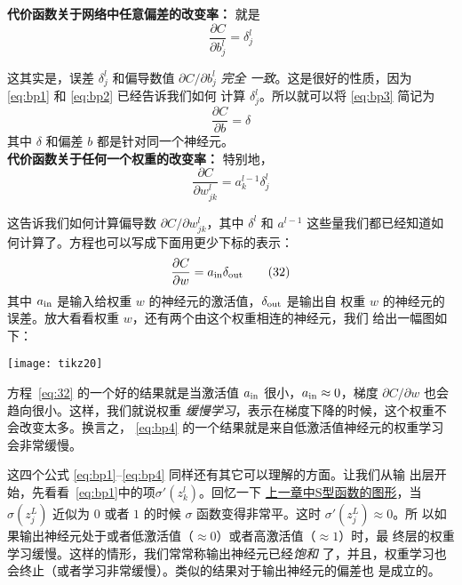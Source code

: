 \textbf{代价函数关于网络中任意偏差的改变率：} 就是
\begin{equation}
  \frac{\partial C}{\partial b^l_j} = \delta^l_j
  \label{eq:bp3}\tag{BP3}
\end{equation}

这其实是，误差 $\delta^l_j$ 和偏导数值 $\partial C / \partial b^l_j$ \emph{完全
  一致}。这是很好的性质，因为 \eqref{eq:bp1} 和 \eqref{eq:bp2} 已经告诉我们如何
计算 $\delta^l_j$。所以就可以将 \eqref{eq:bp3} 简记为
\begin{equation}
  \frac{\partial C}{\partial b} = \delta
  \label{eq:31}\tag{31}
\end{equation}
其中 $\delta$ 和偏差 $b$ 都是针对同一个神经元。\\

\textbf{代价函数关于任何一个权重的改变率：} 特别地，
\begin{equation}
  \frac{\partial C}{\partial w^l_{jk}} = a^{l-1}_k \delta^l_j
  \label{eq:bp4}\tag{BP4}
\end{equation}

这告诉我们如何计算偏导数 $\partial C/\partial w_{jk}^l$，其中 $\delta^l$ 和
$a^{l-1}$ 这些量我们都已经知道如何计算了。方程也可以写成下面用更少下标的表示：
\begin{equation}
  \frac{\partial
    C}{\partial w} = a_{\rm in} \delta_{\rm out}
  \label{eq:32}\tag{32}
\end{equation}
其中 $a_{\rm in}$ 是输入给权重 $w$ 的神经元的激活值，$\delta_{\rm out}$ 是输出自
权重 $w$ 的神经元的误差。放大看看权重 $w$，还有两个由这个权重相连的神经元，我们
给出一幅图如下：

\begin{center}
  \texttt{[image: tikz20]}
\end{center}

方程~\eqref{eq:32} 的一个好的结果就是当激活值 $a_{\rm in}$ 很小，$a_{\rm in}
\approx 0$，梯度 $\partial C/\partial w$ 也会趋向很小。这样，我们就说权重%
\emph{缓慢学习}，表示在梯度下降的时候，这个权重不会改变太多。换言之，
\eqref{eq:bp4} 的一个结果就是来自低激活值神经元的权重学习会非常缓慢。

这四个公式 \eqref{eq:bp1}--\eqref{eq:bp4} 同样还有其它可以理解的方面。让我们从输
出层开始，先看看~\eqref{eq:bp1}中的项$\sigma'(z_k^l)$。回忆一下%
\hyperref[fig:StepFunction]{上一章中S型函数的图形}，当 $\sigma(z^L_j)$ 近似为
$0$ 或者 $1$ 的时候 $\sigma$ 函数变得非常平。这时 $\sigma'(z^L_j) \approx 0$。所
以如果输出神经元处于或者低激活值（$\approx 0$）或者高激活值（$\approx 1$）时，最
终层的权重学习缓慢。这样的情形，我们常常称输出神经元已经\emph{饱和}
了，并且，权重学习也会终止（或者学习非常缓慢）。类似的结果对于输出神经元的偏差也
是成立的。

